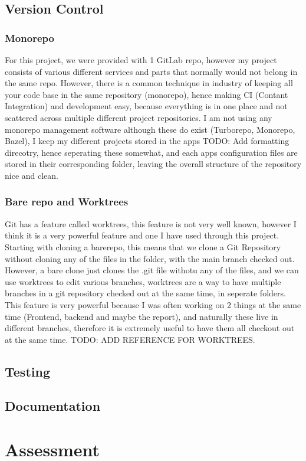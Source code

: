 \documentclass[titlepage]{article}
\begin{document}
\subsection{Version Control}

\subsubsection{Monorepo}
For this project, we were provided with 1 GitLab repo, however my project consists of various different services and parts that normally would not belong in the same repo. However, there is a common technique in industry of keeping all your code base in the same repository (monorepo), hence making CI (Contant Integration) and development easy, because everything is in one place and not scattered across multiple different project repositories. I am not using any monorepo management software although these do exist (Turborepo, Monorepo, Bazel), I keep my different projects stored in the apps TODO: Add formatting direcotry, hence seperating these somewhat, and each apps configuration files are stored in their corresponding folder, leaving the overall structure of the repository nice and clean.

\subsubsection{Bare repo and Worktrees}
Git has a feature called worktrees, this feature is not very well known, however I think it is a very powerful feature and one I have used through this project. Starting with cloning a barerepo, this means that we clone a Git Repository without cloning any of the files in the folder, with the main branch checked out. However, a bare clone just clones the .git file withotu any of the files, and we can use worktrees to edit various branches, worktrees are a way to have multiple branches in a git repository checked out at the same time, in seperate folders. This feature is very powerful because I was often working on 2 things at the same time (Frontend, backend and maybe the report), and naturally these live in different branches, therefore it is extremely useful to have them all checkout out at the same time. TODO: ADD REFERENCE FOR WORKTREES.

\subsection{Testing}

\subsection{Documentation}

\section{Assessment}



\end{document}
